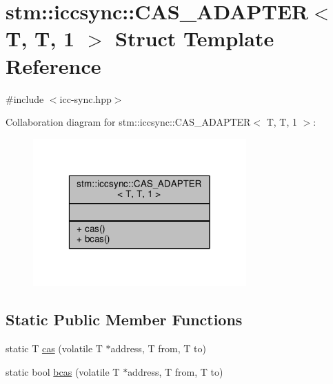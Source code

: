 \hypertarget{structstm_1_1iccsync_1_1CAS__ADAPTER_3_01T_00_01T_00_011_01_4}{\section{stm\-:\-:iccsync\-:\-:C\-A\-S\-\_\-\-A\-D\-A\-P\-T\-E\-R$<$ T, T, 1 $>$ Struct Template Reference}
\label{structstm_1_1iccsync_1_1CAS__ADAPTER_3_01T_00_01T_00_011_01_4}
}


{\ttfamily \#include $<$icc-\/sync.\-hpp$>$}



Collaboration diagram for stm\-:\-:iccsync\-:\-:C\-A\-S\-\_\-\-A\-D\-A\-P\-T\-E\-R$<$ T, T, 1 $>$\-:
\nopagebreak
\begin{figure}[H]
\begin{center}
\leavevmode
\includegraphics[width=232pt]{structstm_1_1iccsync_1_1CAS__ADAPTER_3_01T_00_01T_00_011_01_4__coll__graph}
\end{center}
\end{figure}
\subsection*{Static Public Member Functions}
\begin{DoxyCompactItemize}
\item 
static T \hyperlink{structstm_1_1iccsync_1_1CAS__ADAPTER_3_01T_00_01T_00_011_01_4_a0bc4863b604c4485fabed43837ae5424}{cas} (volatile T $\ast$address, T from, T to)
\item 
static bool \hyperlink{structstm_1_1iccsync_1_1CAS__ADAPTER_3_01T_00_01T_00_011_01_4_a45353a870ba872772b52adfef96fe5b2}{bcas} (volatile T $\ast$address, T from, T to)
\end{DoxyCompactItemize}


